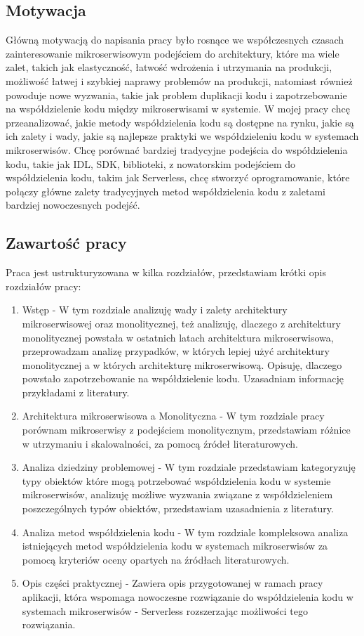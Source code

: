 \documentclass[runningheads,12pt]{llncs}
\begin{document}
\subsection{Motywacja}
Główną motywacją do napisania pracy było rosnące we współczesnych czasach zainteresowanie mikroserwisowym podejściem do architektury, które ma wiele zalet, takich jak elastyczność, łatwość wdrożenia i utrzymania na produkcji, możliwość łatwej i szybkiej naprawy problemów na produkcji, natomiast również powoduje nowe wyzwania, takie jak problem duplikacji kodu i zapotrzebowanie na współdzielenie kodu między mikroserwisami w systemie.
W mojej pracy chcę przeanalizować, jakie metody współdzielenia kodu są dostępne na rynku, jakie są ich zalety i wady, jakie są najlepsze praktyki we współdzieleniu kodu w systemach mikroserwisów. Chcę porównać bardziej tradycyjne podejścia do współdzielenia kodu, takie jak IDL, SDK, biblioteki, z nowatorskim podejściem do współdzielenia kodu, takim jak Serverless, chcę stworzyć oprogramowanie, które połączy główne zalety tradycyjnych metod współdzielenia kodu z zaletami bardziej nowoczesnych podejść.

\newpage

\subsection{Zawartość pracy}
Praca jest ustrukturyzowana w kilka rozdziałów, przedstawiam krótki opis rozdziałów pracy:
\begin{enumerate}
    \item Wstęp - W tym rozdziale analizuję wady i zalety architektury mikroserwisowej oraz monolitycznej, też analizuję, dlaczego z architektury monolitycznej powstała w ostatnich latach architektura mikroserwisowa, przeprowadzam analizę przypadków, w których lepiej użyć architektury monolitycznej a w których architekturę mikroserwisową. Opisuję, dlaczego powstało zapotrzebowanie na współdzielenie kodu. Uzasadniam informację przykładami z literatury.
    \item Architektura mikroserwisowa a Monolityczna - W tym rozdziale pracy porównam mikroserwisy z podejściem monolitycznym, przedstawiam różnice w utrzymaniu i skalowalności, za pomocą źródeł literaturowych.
    \item Analiza dziedziny problemowej - W tym rozdziale przedstawiam kategoryzuję typy obiektów które mogą potrzebować współdzielenia kodu w systemie mikroserwisów, analizuję możliwe wyzwania związane z współdzieleniem poszczególnych typów obiektów, przedstawiam uzasadnienia z literatury.
    \item Analiza metod współdzielenia kodu - W tym rozdziale kompleksowa analiza istniejących metod współdzielenia kodu w systemach mikroserwisów za pomocą kryteriów oceny opartych na źródłach literaturowych.
    \item Opis części praktycznej - Zawiera opis przygotowanej w ramach pracy aplikacji, która wspomaga nowoczesne rozwiązanie do współdzielenia kodu w systemach mikroserwisów - Serverless rozszerzając możliwości tego rozwiązania.
\end{enumerate}
\end{document}
